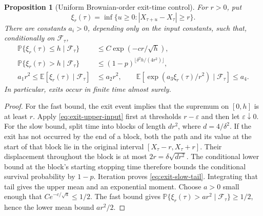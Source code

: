 \documentclass[11pt]{article}
\newtheorem{proposition}[theorem]{Proposition}
\theoremstyle{definition}\newtheorem{definition}[theorem]{Definition}
\theoremstyle{remark}\newtheorem{remark}[theorem]{Remark}
\begin{document}
\begin{proposition}[Uniform Brownian-order exit-time control]
\label{prop:diffusive-exit-time}
For $r>0$, put
\[
 \xi_r(\tau)=\inf\{u\ge0:|X_{\tau+u}-X_\tau|\ge r\}.
\]
There are constants $a_i>0$, depending only on the input constants,
such that, conditionally on $\mathcal F_\tau$,
\begin{align}
 \mathbb P\{\xi_r(\tau)\le h\mid\mathcal F_\tau\}
   &\le C\exp(-cr/\sqrt h),\label{eq:exit-fast-tail}\\
 \mathbb P\{\xi_r(\tau)>h\mid\mathcal F_\tau\}
   &\le (1-p)^{\lfloor\delta^2h/(4r^2)\rfloor},
       \label{eq:exit-slow-tail}\\
 a_1r^2\le\mathbb E[\xi_r(\tau)\mid\mathcal F_\tau]
   &\le a_2r^2,\qquad
 \mathbb E[\exp(a_3\xi_r(\tau)/r^2)\mid\mathcal F_\tau]
   \le a_4.\label{eq:exit-moments}
\end{align}
In particular, exits occur in finite time almost surely.
\end{proposition}
\begin{proof}
For the fast bound, the exit event implies that the supremum on $[0,h]$
is at least $r$. Apply \eqref{eq:exit-upper-input} first at thresholds
$r-\varepsilon$ and then let $\varepsilon\downarrow0$.
For the slow bound, split time into blocks of length
$d r^2$, where $d=4/\delta^2$. If the exit has not occurred by the end
of a block, both the path and its value at the start of that block lie
in the original interval $[X_\tau-r,X_\tau+r]$. Their displacement
throughout the block is at most $2r=\delta\sqrt{d r^2}$.
The conditional lower bound at the block's starting stopping time
therefore bounds the conditional survival probability by $1-p$.
Iteration proves \eqref{eq:exit-slow-tail}. Integrating that tail gives
the upper mean and an exponential moment. Choose $a>0$ small enough
that $Ce^{-c/\sqrt a}\le1/2$. The fast bound gives
$\mathbb P\{\xi_r(\tau)>ar^2\mid\mathcal F_\tau\}\ge1/2$,
hence the lower mean bound $ar^2/2$.
\end{proof}
\end{document}

